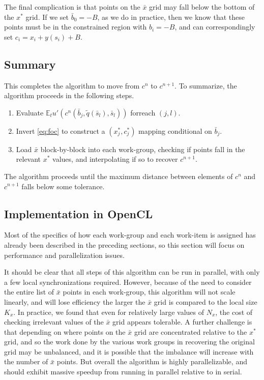 \documentclass[a4paper,12pt]{article}
\newcommand{\E}{\mathbb{E}}
\numberwithin{equation}{section}
\theoremstyle{definition}
\begin{document}
The final complication is that points on the $\bar{x}$ grid may fall
below the bottom of the $x^*$ grid. If we set $\bar{b}_0 = -B$, as we
do in practice, then we know that these points must be in the
constrained region with $b_i = -B$, and can correspondingly set $c_i =
x_i + y(s_i) + B$.

\subsection{Summary}

This completes the algorithm to move from $c^n$ to $c^{n+1}$. To
summarize, the algorithm proceeds in the following steps.

\begin{enumerate}
\item Evaluate $\E_t u'(c^n(\bar{b}_j, \tilde{q}(\bar{s}_l),
  \bar{s}_l))$ forreach $(j,l)$.
\item Invert \eqref{eq:foc} to construct a $(x_j^*, c_j^*)$ mapping
  conditional on $\bar{b}_j$.
\item Load $\bar{x}$ block-by-block into each work-group, checking if
  points fall in the relevant $x^*$ values, and interpolating if so
  to recover $c^{n+1}$.
\end{enumerate}

The algorithm proceeds until the maximum distance between elements of
$c^n$ and $c^{n+1}$ falls below some tolerance.

\subsection{Implementation in OpenCL}

Most of the specifics of how each work-group and each work-item is assigned has already been described in the preceding sections, so this section will focus on performance and parallelization issues.

It should be clear that all steps of this algorithm can be run in
parallel, with only a few local synchronizations required. However,
because of the need to consider the entire list of $\bar{x}$ points in
each work-group, this algorithm will not scale linearly, and will lose
efficiency the larger the $\bar{x}$ grid is compared to the local size
$K_x$. In practice, we found that even for relatively large values of
$N_x$, the cost of checking irrelevant values of the $\bar{x}$ grid
appears tolerable. A further challenge is that depending on where
points on the $\bar{x}$ grid are concentrated relative to the $x^*$
grid, and so the work done by the various work groups in recovering
the original grid may be unbalanced, and it is possible that the
imbalance will increase with the number of $\bar{x}$ points. But
overall the algorithm is highly parallelizable, and should exhibit
massive speedup from running in parallel relative to in serial.
\end{document}

